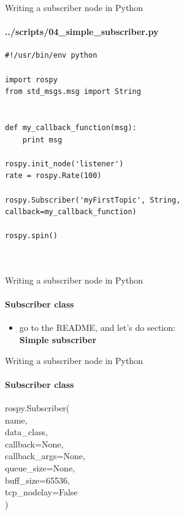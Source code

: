 \documentclass{beamer}
\begin{document}
\begin{frame}[fragile]{Writing a subscriber node in Python}
        \framesubtitle{../scripts/04\_simple\_subscriber.py}
        
    \begin{lstlisting}
#!/usr/bin/env python

import rospy
from std_msgs.msg import String


def my_callback_function(msg):
    print msg

rospy.init_node('listener')
rate = rospy.Rate(100)

rospy.Subscriber('myFirstTopic', String, callback=my_callback_function)

rospy.spin()

    
    \end{lstlisting}
\end{frame}



\begin{frame}[fragile]{Writing a subscriber node in Python}
    \framesubtitle{Subscriber class}
    
    
    \begin{itemize}
        \centering
        \item go to the README, and let's do section:\\ 
        \textbf{Simple subscriber}
    \end{itemize} 
\end{frame}


\begin{frame}[fragile]{Writing a subscriber node in Python}
    \framesubtitle{Subscriber class}
    \begin{focus}
        
        \ttfamily rospy.Subscriber(\\
        {\color{red}name},\\
        {\color{red}data\_class},\\
        {\color{red}callback=None}, \\
        {\color{blue}callback\_args=None},\\
        {\color{blue}queue\_size=None},\\
        {\color{blue}buff\_size=65536},\\
        {\color{blue}tcp\_nodelay=False}\\)
    \end{focus}
    
\end{frame}
\end{document}
